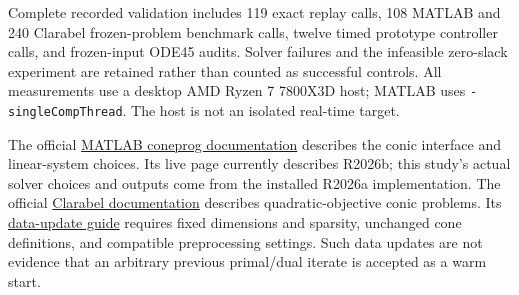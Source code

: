 \documentclass[11pt]{article}
\begin{document}
Complete recorded validation includes 119 exact replay calls, 108 MATLAB and
240 Clarabel frozen-problem benchmark calls, twelve timed prototype controller
calls, and frozen-input ODE45 audits. Solver failures and the infeasible
zero-slack experiment are retained rather than counted as successful controls.
All measurements use a desktop AMD Ryzen 7 7800X3D host; MATLAB uses
\texttt{-singleCompThread}. The host is not an isolated real-time target.

The official \href{https://www.mathworks.com/help/optim/ug/coneprog.html}{MATLAB
coneprog documentation} describes the conic interface and linear-system
choices. Its live page currently describes R2026b; this study's actual
solver choices and outputs come from the installed R2026a implementation.
The official \href{https://clarabel.org/}{Clarabel documentation} describes
quadratic-objective conic problems. Its
\href{https://clarabel.org/stable/user_guide_data_updating/}{data-update guide}
requires fixed dimensions and sparsity, unchanged cone definitions, and
compatible preprocessing settings. Such data updates are not evidence that
an arbitrary previous primal/dual iterate is accepted as a warm start.
\end{document}
